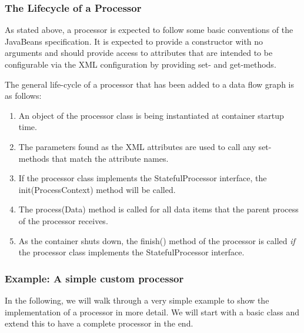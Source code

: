 
\subsubsection{\label{sec:processorLifecycle}The Lifecycle of a Processor}
As stated above, a processor is expected to follow some basic
conventions of the JavaBeans specification. It is expected to provide a
constructor with no arguments and should provide access to attributes
that are intended to be configurable via the XML configuration by
providing {\ttfamily set}- and {\ttfamily get}-methods.

The general life-cycle of a processor that has been added to a data flow
graph is as follows:

\begin{enumerate}
  \item An object of the processor class is being instantiated at
    container startup time.
  \item The parameters found as the XML attributes are used to
    call any {\ttfamily set}-methods that match the attribute names.
  \item If the processor class implements the {\ttfamily StatefulProcessor}
    interface, the {\ttfamily init(ProcessContext)} method will be called.
  \item The {\ttfamily process(Data)} method is called for all data items
    that the parent process of the processor receives.
  \item As the container shuts down, the {\ttfamily finish()} method of
    the processor is called {\em if} the processor class implements the
    {\ttfamily StatefulProcessor} interface.
\end{enumerate}




\subsubsection{\label{sec:exampleProcessor}Example: A simple custom processor}
In the following, we will walk through a very simple example to show
the implementation of a processor in more detail. We will start with a
basic class and extend this to have a complete processor in the end.

